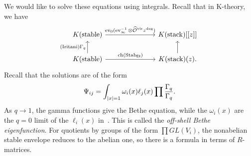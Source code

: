 \documentclass[leqno, openany]{memoir}
\theoremstyle{definition}
\theoremstyle{remark}
\theoremstyle{plain}
\theoremstyle{definition}
\theoremstyle{remark}
\newcommand{\mc}[1]{\mathcal{#1}}
\newcommand{\mr}[1]{\mathrm{#1}}
\newcommand{\ms}[1]{\mathsf{#1}}
\newcommand{\on}[1]{\operatorname{#1}}
\newcommand{\wh}[1]{\widehat{#1}}
\DeclareMathOperator{\ch}{ch}
\begin{document}
We would like to solve these equations using integrals. Recall that in K-theory, we have
\begin{equation*}
\begin{tikzcd}
    K(\mr{stable}) \ar{rrr}{\on{ev}_0 (\on{ev}_{\infty}^{-1} \otimes \wh{\mc{O}}^{\mr{vir}} z^{\deg})} & & & K(\mr{stack})[[z]] \\
    K(\mr{stable}) \ar{u}{(\mr{Iritani})\Gamma_q} \ar{rrr}{\ch(\on{Stab}_{\ms{Ell}})} & & & K(\mr{stack})(z) \ar{u}.
\end{tikzcd}
\end{equation*}
Recall that the solutions are of the form
\[ \Psi_{ij} = \int_{\abs{x}=1} \omega_i(x) \ell_j(x) \prod \frac{\Gamma_q}{\Gamma_q}. \]
As $q \to 1$, the gamma functions give the Bethe equation, while the $\omega_i(x)$ are the $q=0$ limit of the $\ell_i(x)$ in~\cite{qmapbethe}. This is called the \textit{off-shell Bethe eigenfunction}. For quotients by groups of the form $\prod GL(V_i)$, the nonabelian stable envelope reduces to the abelian one, so there is a formula in terms of $R$-matrices.
\end{document}
